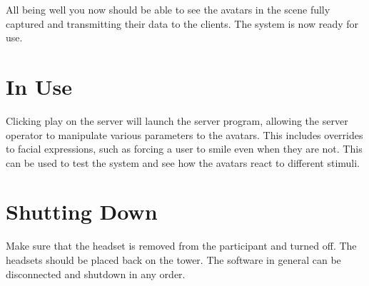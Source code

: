 All being well you now should be able to see the avatars in the scene fully captured and transmitting their data to the clients. The system is now ready for use.

\section{In Use}
Clicking play on the server will launch the server program, allowing the server operator to manipulate various parameters to the avatars. This includes overrides to facial expressions, such as forcing a user to smile even when they are not. This can be used to test the system and see how the avatars react to different stimuli.

\section{Shutting Down}
Make sure that the headset is removed from the participant and turned off. The headsets should be placed back on the tower. The software in general can be disconnected and shutdown in any order.